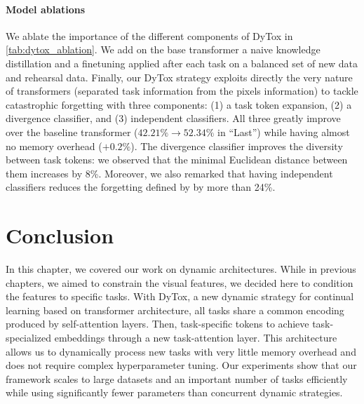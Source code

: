 
\FloatBarrier

\label{sec:dytox_ablations}
\paragraph{Model ablations} We ablate the importance of the different components of DyTox in
\autoref{tab:dytox_ablation}. We add on the base transformer a naive knowledge distillation
\citep{hinton2015knowledge_distillation} and a finetuning
\citep{castro2018end_to_end_inc_learn} applied after each
task on a balanced set of new data and rehearsal data. Finally, our DyTox strategy exploits directly
the very nature of transformers (separated task information from the pixels information) to tackle
catastrophic forgetting with three components: (1) a task token expansion, (2) a divergence
classifier, and (3) independent classifiers. All three greatly improve over the baseline transformer
($42.21\% \rightarrow 52.34\%$ in ``Last'') while having almost no memory overhead ($+0.2\%$). The
divergence classifier improves the diversity between task tokens: we observed that the minimal
Euclidean distance between them increases by 8\%. Moreover, we also remarked that having independent
classifiers reduces the forgetting defined by \citet{chaudhry2018riemannien_walk} by more than
24\%.


\section{Conclusion}

In this chapter, we covered our work on dynamic architectures. While in previous chapters, we aimed
to constrain the visual features, we decided here to condition the features to specific tasks. With
DyTox, a new dynamic strategy for continual learning based on transformer architecture, all tasks
share a common encoding produced by self-attention layers. Then, task-specific tokens to achieve
task-specialized embeddings through a new task-attention layer. This architecture allows us to
dynamically process new tasks with very little memory overhead and does not require complex
hyperparameter tuning. Our experiments show that our framework scales to large datasets and an
important number of tasks efficiently while using significantly fewer parameters than concurrent
dynamic strategies.
